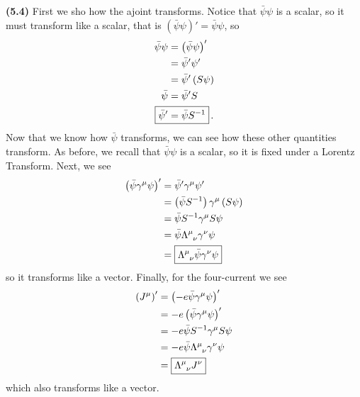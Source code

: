 \documentclass[10pt]{article}
\begin{document}
\textbf{(5.4)} First we sho how the ajoint transforms. Notice that $\bar{\psi}\psi$ is a scalar, so it must transform like a scalar, that is $\left(\bar{\psi}\psi\right)' = \bar{\psi}\psi$, so
\begin{equation*}
  \begin{split}
    \bar{\psi}\psi & = \left(\bar{\psi}\psi\right)'\\
    & = \bar{\psi}'\psi' \\
    & = \bar{\psi}'\left(S \psi\right) \\
    \bar{\psi} & = \bar{\psi}'S \\
    \Aboxed{\bar{\psi}' & = \bar{\psi}S^{-1}} \, .\\
  \end{split}
\end{equation*}
Now that we know how $\bar{\psi}$ transforms, we can see how these other quantities transform. As before, we recall that $\bar{\psi}\psi$ is a scalar, so it is fixed under a Lorentz Transform. Next, we see
\begin{equation*}
  \begin{split}
    \left(\bar{\psi}\gamma^{\mu}\psi\right)' & = \bar{\psi}'\gamma^{\mu}\psi' \\
    & = \left(\bar{\psi}S^{-1}\right)\gamma^{\mu}\left(S\psi\right) \\
    & = \bar{\psi}S^{-1}\gamma^{\mu}S\psi \\
    & = \bar{\psi}\tensor{\Lambda}{^{\mu}_{\nu}}\gamma^{\nu}\psi \\
    & = \boxed{\tensor{\Lambda}{^{\mu}_{\nu}}\bar{\psi}\gamma^{\nu}\psi}\\
  \end{split}
\end{equation*}
so it transforms like a vector. Finally, for the four-current we see
\begin{equation*}
  \begin{split}
    \left(J^{\mu}\right)' & = \left(-e\bar{\psi}\gamma^{\mu}\psi\right)' \\
    & = -e\left(\bar{\psi}\gamma^{\mu}\psi\right)' \\
    & = -e\bar{\psi}S^{-1}\gamma^{\mu}S\psi \\
    & = -e\bar{\psi}\tensor{\Lambda}{^{\mu}_{\nu}}\gamma^{\nu}\psi \\
    & = \boxed{\tensor{\Lambda}{^{\mu}_{\nu}}J^{\nu}} \\
  \end{split}
\end{equation*}
which also transforms like a vector. 
\end{document}
